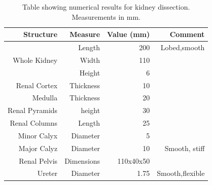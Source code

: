 \documentclass[12pt]{article}
\begin{document}
\begin{table}[H]
\centering{}
\caption{Table showing numerical results for kidney dissection. Measurements in mm.}
\label{tab:kid}
\begin{tabular}{|r|r|r|r|}
	\hline
	Structure & Measure & Value (mm) & Comment\\
	\hline
	\hline
	\multirow{3}{*}{Whole Kidney}
	&Length&200&Lobed,smooth\\
	&Width&110&\\
	&Height&6&\\
	\hline
	Renal Cortex&Thickness&10&\\
	\hline
	Medulla&Thickness&20&\\

	\hline
	Renal Pyramids&height&30&\\	
	\hline
	Renal Columns&Length&25&\\
	\hline
	Minor Calyx&Diameter&5&\\
	\hline
	Major Calyz&Diameter&10&Smooth, stiff\\
	\hline
	Renal Pelvis&Dimensions&110x40x50&\\
	\hline
	Ureter&Diameter&1.75&Smooth,flexible\\
	\hline
	
\end{tabular}
\end{table}
\end{document}
